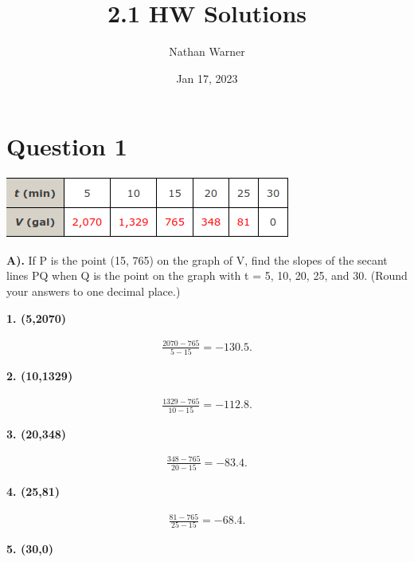 \documentclass{report}
\title{\Huge{2.1 HW Solutions}}
\author{\huge{Nathan Warner}}
\date{\huge{Jan 17, 2023}}
\begin{document}
    \maketitle
    \section{\Large{Question 1}}

    \bigbreak \noindent 
    
    \bigbreak \noindent 
    \begin{center}
        \includegraphics[scale=0.66]{im1.png}
    \end{center}

    \bigbreak \noindent 
    \textbf{A).} If P is the point (15, 765) on the graph of V, find the slopes 
    of the secant lines PQ when Q is the point on the graph with t = 5, 10, 20, 25, and 30. 
    (Round your answers to one decimal place.)
    
    \textbf{1. (5,2070)} 

    \begin{align*}
        \frac{2070-765}{5-15} =-130.5
    .\end{align*}

    \textbf{2. (10,1329)}
    
    \begin{align*}
        \frac{1329-765}{10-15} = -112.8     
    .\end{align*}

    \textbf{3. (20,348)}

    \begin{align*}
        \frac{348-765}{20-15} = -83.4
    .\end{align*}

    \textbf{4. (25,81)}
    
    \begin{align*}
        \frac{81-765}{25-15} = -68.4
    .\end{align*}

    \textbf{5. (30,0)}
    
\end{document}
